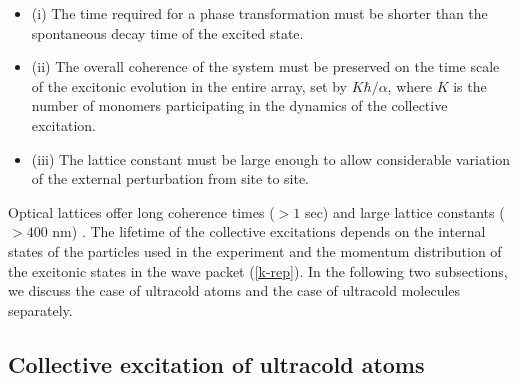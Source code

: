 \begin{itemize}
\item
 (i) The time required for a  phase transformation must
be shorter than the spontaneous decay time of the excited
state.

\item
 (ii) The overall coherence of the system  must be preserved
on the time scale of the excitonic evolution in the entire array, set by $K\hbar/\alpha$, where $K$
 is the number of monomers participating in the dynamics of the collective excitation.

\item
(iii) The lattice constant must be large enough to allow considerable variation of the external
 perturbation from site to site.

%
\end{itemize}

Optical lattices offer long coherence times ($> 1$ sec) and large lattice constants ($>400$ nm)
 \cite{optical-lattice-review}. The lifetime of the
collective excitations depends on the internal states
 of the particles used in the experiment and the momentum distribution of the excitonic states in the wave packet
(\ref{k-rep}). In the following two subsections, we discuss the case of ultracold atoms and the case of ultracold molecules separately. 

\subsection{Collective excitation of ultracold atoms}
\label{sec:excitationAtoms}

